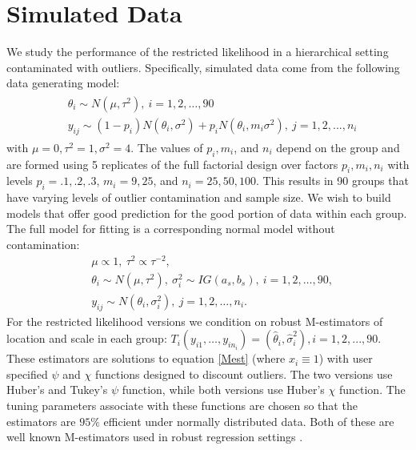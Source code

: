 \documentclass[ba]{imsart}
\begin{document}
%
%

\section{Simulated Data}
\label{simData}
We study the performance of the restricted likelihood in a hierarchical setting contaminated with outliers. Specifically, simulated data come from the following data generating model:
\begin{align}
\label{gensim2}
\begin{split}
& \theta_{i}  \sim   N(\mu, \tau^{2}),  \ i = 1, 2, \dots, 90  \\ 
& y_{ij} \sim (1-p_{i})N(\theta_{i}, \sigma^{2}) + p_{i}N(\theta_{i}, m_{i}\sigma^{2}),\  j = 1, 2,..., n_{i}
\end{split}
\end{align}
with $\mu = 0, \tau^{2} = 1, \sigma^{2} = 4$. The values of $p_{i}, m_{i}$, and $n_{i}$ depend on the group and are formed using 5 replicates of the full factorial design over factors $p_{i},m_{i},n_{i}$ with levels $p_{i} = .1, .2, .3$, $m_{i} = 9, 25$, and $n_{i} = 25, 50, 100$. This results in 90 groups that have varying levels of outlier contamination and sample size. We wish to build models that offer good prediction for the good portion of data within each group. The full model for fitting is a corresponding normal model without contamination:
\begin{equation}
\label{fullsim2}
\begin{split}
& \mu \propto 1, \  \tau^{2} \propto \tau^{-2}, \\
& \theta_{i}\sim N(\mu, \tau^{2}), \  \sigma^{2}_{i} \sim IG(a_{s}, b_{s}),  \ i = 1, 2, \dots, 90, \\ 
& y_{ij}\sim  N(\theta_{i},\sigma^{2}_{i}), \ j = 1, 2, \dots, n_{i}.
\end{split}
\end{equation}
For the restricted likelihood versions we condition on robust M-estimators of location and scale in each group: $T_{i}(y_{i1}, \dots, y_{in_{i}}) = (\hat\theta_{i}, \hat\sigma^{2}_{i}), i = 1, 2, ..., 90$.  These estimators are solutions to equation \eqref{Mest} (where $x_{i}\equiv 1$) with user specified $\psi$ and $\chi$ functions designed to discount outliers. The two versions use Huber's and Tukey's $\psi$ function, while both versions use Huber's $\chi$ function. The tuning parameters associate with these functions are chosen so that the estimators are $95\%$ efficient under normally distributed data. Both of these are well known M-estimators used in robust regression settings  \citep{huber2009}.  %
\end{document}
